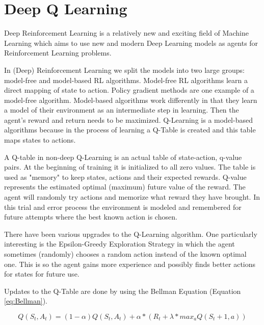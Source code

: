 \documentclass[b5paper]{book}
\let\cite\parencite
\begin{document}
\section{Deep Q Learning}



Deep Reinforcement Learning is a relatively new and exciting field of Machine Learning which aims to use new and modern Deep Learning models as agents for Reinforcement Learning problems.

In (Deep) Reinforcement Learning we split the models into two large groups: model-free and model-based RL algorithms. Model-free RL algorithms learn a direct mapping of state to action. Policy gradient methods are one example of a model-free algorithm. Model-based algorithms work differently in that they learn a model of their environment as an intermediate step in learning. Then the agent's reward and return needs to be maximized. Q-Learning is a model-based algorithms because in the process of learning a Q-Table is created and this table maps states to actions.

A Q-table in non-deep Q-Learning is an actual table of state-action, q-value pairs. At the beginning of training it is initialized to all zero values. The table is used as "memory" to keep states, actions and their expected rewards. Q-value represents the estimated optimal (maximum) future value of the reward. The agent will randomly try actions and memorize what reward they have brought. In this trial and error process the environment is modeled and remembered for future attempts where the best known action is chosen.

There have been various upgrades to the Q-Learning algorithm. One particularly interesting is the Epsilon-Greedy Exploration Strategy in which the agent sometimes (randomly) chooses a random action instead of the known optimal one. This is so the agent gains more experience and possibly finds better actions for states for future use.

Updates to the Q-Table are done by using the Bellman Equation \cite{baird1999gradient} (Equation \ref{eq:Bellman}).

\begin{equation}
\label{eq:Bellman}
Q(S_t, A_t) = (1 - \alpha) Q(S_t, A_t) + \alpha * (R_t + \lambda * max_a Q(S_t+1, a))
\end{equation}
\end{document}
